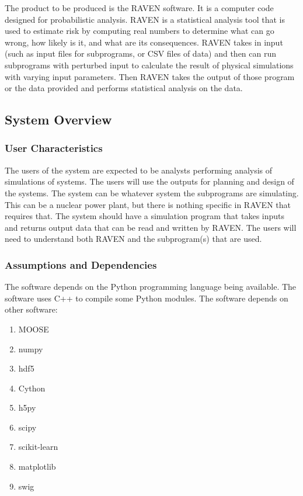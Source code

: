 \documentclass{article}
\begin{document}
The product to be produced is the RAVEN software.  It is a computer
code designed for probabilistic analysis.  RAVEN is a statistical
analysis tool that is used to estimate risk by computing real numbers
to determine what can go wrong, how likely is it, and what are its
consequences.  RAVEN takes in input (such as input files for
subprograms, or CSV files of data) and then can run subprograms with
perturbed input to calculate the result of physical simulations with
varying input parameters.  Then RAVEN takes the output of those
program or the data provided and performs statistical analysis on the
data.

\subsection{System Overview}

\subsubsection{User Characteristics}

The users of the system are expected to be analysts performing
analysis of simulations of systems.  The users will use the outputs
for planning and design of the systems.  The system can be whatever
system the subprograms are simulating.  This can be a nuclear power
plant, but there is nothing specific in RAVEN that requires that.  The
system should have a simulation program that takes inputs and returns
output data that can be read and written by RAVEN.  The users will
need to understand both RAVEN and the subprogram(s) that are used.

\subsubsection{Assumptions and Dependencies}

The software depends on the Python programming language being
available.  The software uses C++ to compile some Python modules.  The
software depends on other software:

\begin{enumerate}
\item MOOSE
\item numpy
\item hdf5
\item Cython
\item h5py
\item scipy
\item scikit-learn
\item matplotlib
\item swig
\end{enumerate}
\end{document}
